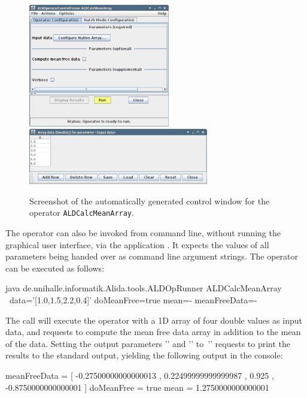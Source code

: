\begin{center}
\begin{figure}[t]
\begin{center}
\hspace*{4cm}
\includegraphics[width=0.55\textwidth,clip,trim=0 0 0 0]
				{../images/screenShotALDCalcMeanArray}\\[-1cm]
\hspace*{-3cm}
\includegraphics[width=0.7\textwidth,clip,trim=0 0 0 0]
				{../images/screenShotALDCalcMeanArrayConfig}\\
\caption{\label{fig:calcMeanArrayGUI}Screenshot of the automatically generated
control window for the operator {\tt ALDCalcMeanArray}.}
\end{center}
\end{figure}
\end{center}

\vspace*{-0.5cm}
The operator  can also be invoked from command line,
without running the graphical user interface, via the application
. It expects the values of all parameters being handed over
as command line argument strings. The operator can be executed as follows:
\vspace*{0.5cm}
\begin{code}
    java de.unihalle.informatik.Alida.tools.ALDOpRunner ALDCalcMeanArray \
        data='[1.0,1.5,2.2,0.4]' doMeanFree=true mean=- meanFreeData=-
\end{code}

\newpage
The call will execute the operator with a 1D array of four double values as
input data, and requests to compute the mean free data array in addition to the
mean of the data.
Setting the output parameters '' and ''
to~'\icode{-}' requests to print the results to the standard output, 
yielding the following output in the console:
\vspace*{0.5cm}
\begin{code}
  meanFreeData = [ -0.27500000000000013 , 0.22499999999999987 , 
                     0.925 , -0.8750000000000001 ]
  doMeanFree = true
  mean = 1.2750000000000001
\end{code}
\vspace*{-0.25cm}
